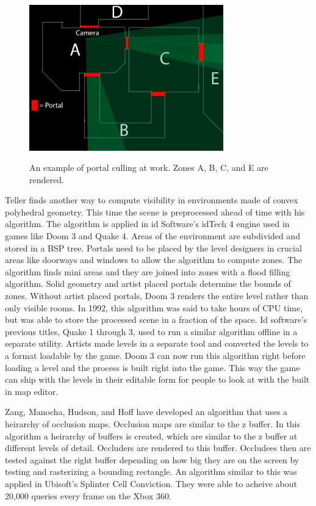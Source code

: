 \documentclass[12pt]{ucthesis}
\newcommand{\captionfonts}{\small\bf\ssp}
\begin{document}
\begin{figure}
\begin{center}
\includegraphics[width=0.75\textwidth]{Images/Portal-Culling.png}
\captionfonts
\caption[Portal Culling]{An example of portal culling at work.  Zones A, B, C, and E are rendered.}
\label{fig:portal-culling}
\end{center}
\end{figure}

Teller finds another way to compute visibility in environments made of convex polyhedral geometry.\cite{Vis-Computations-Densely-Occluded}
This time the scene is preprocessed ahead of time with his algorithm.
The algorithm is applied in id Software's idTech 4 engine used in games like Doom 3 and Quake 4.\cite{Doom3-source-review}
Areas of the environment are subdivided and stored in a BSP tree.
Portals need to be placed by the level designers in crucial areas like doorways and windows to allow the algorithm to compute zones.
The algorithm finds mini areas and they are joined into zones with a flood filling algorithm.
Solid geometry and artist placed portals determine the bounds of zones.
Without artist placed portals, Doom 3 renders the entire level rather than only visible rooms.
In 1992, this algorithm was said to take hours of CPU time, but was able to store the processed scene in a fraction of the space.
Id software's previous titles, Quake 1 through 3, used to run a similar algorithm offline in a separate utility.
Artists made levels in a separate tool and converted the levels to a format loadable by the game.
Doom 3 can now run this algorithm right before loading a level and the process is built right into the game.
This way the game can ship with the levels in their editable form for people to look at with the built in map editor.

Zang, Manocha, Hudson, and Hoff have developed an algorithm that uses a heirarchy of occlusion maps.\cite{heir-occ-map}
Occlusion maps are similar to the z buffer.
In this algorithm a heirarchy of buffers is created, which are similar to the z buffer at different levels of detail.
Occluders are rendered to this buffer.
Occludees then are tested against the right buffer depending on how big they are on the screen by testing and rasterizing a bounding rectangle.
An algorithm similar to this was applied in Ubisoft's Splinter Cell Conviction.\cite{spliter}
They were able to acheive about 20,000 queries every frame on the Xbox 360.
\end{document}
